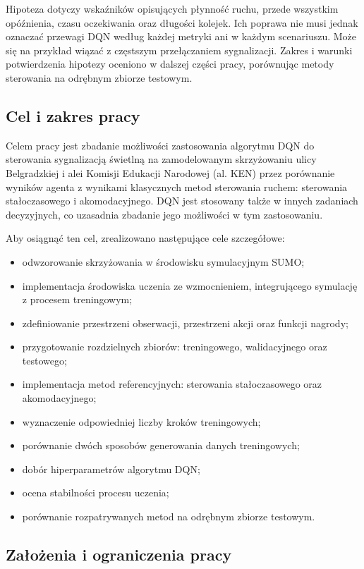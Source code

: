 Hipoteza dotyczy wskaźników opisujących płynność ruchu, przede wszystkim opóźnienia, czasu oczekiwania oraz długości kolejek. Ich poprawa nie musi jednak oznaczać przewagi DQN według każdej metryki ani w każdym scenariuszu. Może się na przykład wiązać z częstszym przełączaniem sygnalizacji. Zakres i warunki potwierdzenia hipotezy oceniono w dalszej części pracy, porównując metody sterowania na odrębnym zbiorze testowym.

\subsection{Cel i zakres pracy}
\label{subsec:cel-zakres}

Celem pracy jest zbadanie możliwości zastosowania algorytmu DQN do sterowania sygnalizacją świetlną na zamodelowanym skrzyżowaniu ulicy Belgradzkiej i alei Komisji Edukacji Narodowej (al. KEN) przez porównanie wyników agenta z wynikami klasycznych metod sterowania ruchem: sterowania stałoczasowego i akomodacyjnego. DQN jest stosowany także w innych zadaniach decyzyjnych, co uzasadnia zbadanie jego możliwości w tym zastosowaniu.

Aby osiągnąć ten cel, zrealizowano następujące cele szczegółowe:
\begin{itemize}
    \item odwzorowanie skrzyżowania w środowisku symulacyjnym SUMO;
    \item implementacja środowiska uczenia ze wzmocnieniem, integrującego symulację z procesem treningowym;
    \item zdefiniowanie przestrzeni obserwacji, przestrzeni akcji oraz funkcji nagrody;
    \item przygotowanie rozdzielnych zbiorów: treningowego, walidacyjnego oraz testowego;
    \item implementacja metod referencyjnych: sterowania stałoczasowego oraz akomodacyjnego;
    \item wyznaczenie odpowiedniej liczby kroków treningowych;
    \item porównanie dwóch sposobów generowania danych treningowych;
    \item dobór hiperparametrów algorytmu DQN;
    \item ocena stabilności procesu uczenia;
    \item porównanie rozpatrywanych metod na odrębnym zbiorze testowym.
\end{itemize}

\subsection{Założenia i ograniczenia pracy}
\label{subsec:zalozenia-ograniczenia}

